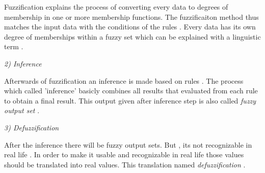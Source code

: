 Fuzzification explains the process of converting every data to degrees of membership in one or more membership functions. The fuzzificaiton method thus matches the input data with the conditions of the rules . Every data has its own degree of memberships within a fuzzy set which can be explained with a linguistic term .

\textit{2) Inference}

Afterwards of fuzzification an inference is made based on rules . The process which called 'inference' basicly combines all results that evaluated from each rule to obtain a final result. This output given after inference step is also called \textit{fuzzy output set} .


\textit{3) Defuzzification}

After the inference there will be fuzzy output sets. But , its not recognizable in real life . In order to make it usable and recognizable in real life  those values should be translated into real values. This translation named \textit{defuzzification} \cite{defuzzification} .

